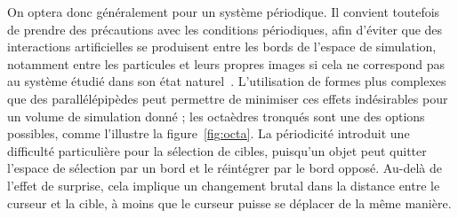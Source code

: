 	On optera donc généralement pour un système périodique. Il convient toutefois de prendre des précautions avec les conditions périodiques, afin d'éviter que des interactions \og artificielles \fg{} se produisent entre les \og bords \fg{} de l'espace de simulation, notamment entre les particules et leurs propres images si cela ne correspond pas au système étudié dans son état naturel~\cite{de1997effect}. L'utilisation de formes plus complexes que des parallélépipèdes peut permettre de minimiser ces effets indésirables pour un volume de simulation donné ; les octaèdres tronqués sont une des options possibles, comme l'illustre la figure~\ref{fig:octa}.
	La périodicité introduit une difficulté particulière pour la sélection de cibles, puisqu'un objet peut quitter l'espace de sélection par un bord et le réintégrer par le bord opposé. Au-delà de l'effet de surprise, cela implique un changement brutal dans la distance entre le curseur et la cible, à moins que le curseur puisse se déplacer de la même manière.
	
	

